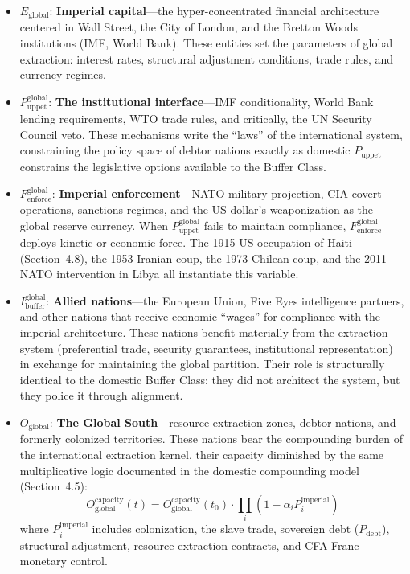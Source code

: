 \documentclass[12pt,openany]{book}
\begin{document}
\begin{itemize}
    \item $E_{\text{global}}$: \textbf{Imperial capital}---the hyper-concentrated financial architecture centered in Wall Street, the City of London, and the Bretton Woods institutions (IMF, World Bank). These entities set the parameters of global extraction: interest rates, structural adjustment conditions, trade rules, and currency regimes.

    \item $P_{\text{uppet}}^{\text{global}}$: \textbf{The institutional interface}---IMF conditionality, World Bank lending requirements, WTO trade rules, and critically, the UN Security Council veto. These mechanisms write the ``laws'' of the international system, constraining the policy space of debtor nations exactly as domestic $P_{\text{uppet}}$ constrains the legislative options available to the Buffer Class.

    \item $F_{\text{enforce}}^{\text{global}}$: \textbf{Imperial enforcement}---NATO military projection, CIA covert operations, sanctions regimes, and the US dollar's weaponization as the global reserve currency. When $P_{\text{uppet}}^{\text{global}}$ fails to maintain compliance, $F_{\text{enforce}}^{\text{global}}$ deploys kinetic or economic force. The 1915 US occupation of Haiti (Section~4.8), the 1953 Iranian coup, the 1973 Chilean coup, and the 2011 NATO intervention in Libya all instantiate this variable.

    \item $I_{\text{buffer}}^{\text{global}}$: \textbf{Allied nations}---the European Union, Five Eyes intelligence partners, and other nations that receive economic ``wages'' for compliance with the imperial architecture. These nations benefit materially from the extraction system (preferential trade, security guarantees, institutional representation) in exchange for maintaining the global partition. Their role is structurally identical to the domestic Buffer Class: they did not architect the system, but they police it through alignment.

    \item $O_{\text{global}}$: \textbf{The Global South}---resource-extraction zones, debtor nations, and formerly colonized territories. These nations bear the compounding burden of the international extraction kernel, their capacity diminished by the same multiplicative logic documented in the domestic compounding model (Section~4.5):
    \[
    O_{\text{global}}^{\text{capacity}}(t) = O_{\text{global}}^{\text{capacity}}(t_0) \cdot \prod_{i} (1 - \alpha_i P_i^{\text{imperial}})
    \]
    where $P_i^{\text{imperial}}$ includes colonization, the slave trade, sovereign debt ($P_{\text{debt}}$), structural adjustment, resource extraction contracts, and CFA Franc monetary control.
\end{itemize}
\end{document}
